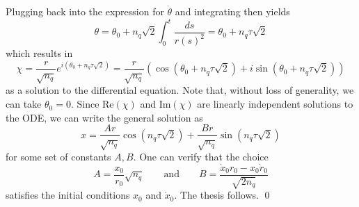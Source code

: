 \documentclass[11pt]{article}
\begin{document}
Plugging back into the expression for $\dot \theta$ and integrating then yields 
\[\theta = \theta_0 +  n_q\sqrt{2}\int_0^t\frac{ds}{r(s)^2} = \theta_0 + n_q\tau\sqrt{2}\]
which results in 
\[\chi = \frac{r}{\sqrt{n_q}}e^{i(\theta_0 + n_q\tau\sqrt{2})} = \frac{r}{\sqrt{n_q}}\left(\cos(\theta_0 + n_q\tau\sqrt{2}) + i\sin(\theta_0 + n_q\tau\sqrt{2})\right)\]
as a solution to the differential equation. Note that, without loss of generality, we can take $\theta_0 = 0$. Since $\text{Re}(\chi)$ and $\text{Im}(\chi)$ are linearly independent solutions to the ODE, we can write the general solution as
\[x = \frac{Ar}{\sqrt{n_q}}\cos(n_q\tau\sqrt{2}) + \frac{Br}{\sqrt{n_q}}\sin( n_q\tau\sqrt{2})\]
for some set of constants $A, B$. One can verify that the choice
\[A = \frac{x_0}{r_0}\sqrt{n_q} \qquad \text{and} \qquad B = \frac{\dot x_0 r_0 - x_0 \dot r_0}{\sqrt{2n_q}}\]
satisfies the initial conditions $x_0$ and $\dot x_0$.  The thesis follows. \qed{}

{}
\end{document}
